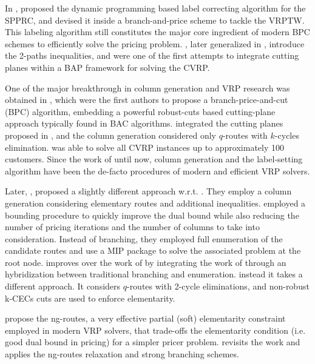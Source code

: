In \citeyear{desrochers1992}, \citeauthor{desrochers1992}
proposed the dynamic programming based label correcting algorithm for the SPPRC,
and devised it inside a branch-and-price scheme to tackle the VRPTW.
This labeling algorithm still constitutes the major core ingredient
of modern BPC schemes to efficiently solve the pricing problem.
\textcite{kohl1999}, later generalized in \cite{desaulniers2008}, introduce the
2-paths inequalities, and were one of the first attempts to integrate
cutting planes within a BAP framework for solving the CVRP.

One of the major breakthrough in column generation and VRP research
was obtained in \textcite{fukasawa2006}, which were the
first authors to propose a branch-price-and-cut (BPC) algorithm,
embedding a powerful robust-cuts based cutting-plane approach
typically found in BAC algorithms.
\citeauthor{fukasawa2006} integrated the cutting planes proposed in \cite{lysgaard2004},
and the column generation considered only $q$-routes with $k$-cycles elimination.
\textcite{fukasawa2006} was able to solve all CVRP instances up to approximately 100 customers.
Since the work of \citeauthor{fukasawa2006} until now, column generation
and the label-setting algorithm have been the de-facto procedures
of modern and efficient VRP solvers.

Later, \textcite{baldacci2008}, proposed a slightly different approach w.r.t. \textcite{fukasawa2006}.
They employ a column generation considering elementary routes and additional inequalities.
\citeauthor{baldacci2008} employed a bounding procedure to quickly
improve the dual bound while also reducing the number
of pricing iterations and the number of columns to take into consideration.
Instead of branching, they employed full enumeration of the candidate
routes and use a MIP package to solve the associated problem at the root node.
\textcite{pessoa2008} improves over the work of \textcite{fukasawa2006}
by integrating the work of \textcite{baldacci2008}
through an hybridization between traditional branching and enumeration.
\textcite{contardo2011} instead it takes a different approach.
It considers $q$-routes with 2-cycle eliminations, and non-robust
k-CECs cuts are used to enforce elementarity.

\textcite{baldacci2011} propose the ng-routes, a very effective
partial (soft) elementarity constraint employed in modern VRP solvers,
that trade-offs the elementarity condition (i.e. good dual bound in pricing)
for a simpler pricer problem.
\textcite{ropke2012} revisits the work \citeauthor{fukasawa2006} and applies
the ng-routes relaxation and strong branching schemes.

